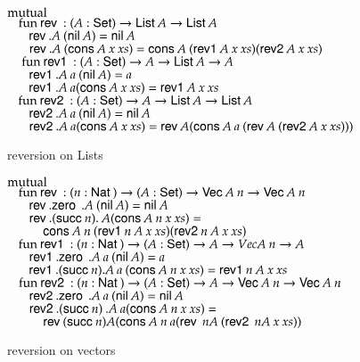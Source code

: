 \begin{figure}[p]
$\mathrm{mutual}\: $  \\
$ \hspace*{3mm} \mathrm{fun}\: \mathsf{rev}\: : ( A : \mathsf{Set} ) \rightarrow{\mathsf{List}\:A \rightarrow\mathsf{List}\:A} $ \\
$ \spc \spc \rev .A \: (\nil A ) = \nil A$\\
$ \spc \spc \rev .A \: (\cons A \:x  \: xs) = \cons A \: (\reva A \: x \: xs) (\revb A \: x \: xs)$\\
$\ \hspace*{3mm} \mathrm{fun}\: \mathsf{rev1}\: : ( A  : \mathsf{Set} ) \rightarrow{A  \rightarrow\mathsf{List}\:A \rightarrow A}$\\
$ \spc \spc \reva .A \: a \: (\nil A ) = a$ \\
$\spc \spc \reva .A \: a (\cons A \: x \: xs) = \reva A \: x \: xs$\\
$\hspace*{3mm} \mathrm{fun}\: \mathsf{rev2}\: : ( A : \mathsf{Set} ) \rightarrow{ A \rightarrow\mathsf{List}\:A \rightarrow\mathsf{List}\:A} $\\
$\spc \spc \revb .A \: a \: (\nil A ) = \nil A $\\
$\spc \spc \revb .A \: a (\cons A\:  x \: xs) = \rev A (\cons A \: a \: (\rev A \: (\revb A \: x \: xs)))$

\caption{reversion on Lists}  
\end{figure}
\begin{figure}[p] 
$\mathrm{mutual}\: $ \\
$\hspace*{3mm} \mathrm{fun}\: \mathsf{rev}\: : ( n : \mathsf{Nat}\:  ) \rightarrow{( A : \mathsf{Set}) \rightarrow{\mathsf{Vec}\:A \: n \rightarrow\mathsf{Vec}\:A \: n}}$\\
$\spc \spc \rev .\zero \: .A  \: (\nil A) = \nil A $\\
$\spc \spc \rev .(\suc n) .\: A (\cons A \: n \: x \: xs) = $\\
$\spcx \cons A \: n \: (\reva n \: A \: x \: xs) (\revb n \: A \: x \: xs) $ \\
$\hspace*{3mm} \mathrm{fun}\: \mathsf{rev1}\: : ( n : \mathsf{Nat}\: ) \rightarrow( A : \mathsf{Set} ) \rightarrow{A \rightarrow Vec A \: n \rightarrow A}$\\
$\spc \spc \reva .\zero  \: .A \: a \: (\nil A) = a $\\
$\spc \spc \reva .(\suc n) .A \: a \: (\cons A \: n \: x \: xs) = \reva n \: A \: x \: xs $\\
$\hspace*{3mm} \mathrm{fun}\: \mathsf{rev2}\: : ( n : \mathsf{Nat}\: ) \rightarrow{( A : \mathsf{Set}) \rightarrow{A \rightarrow\mathsf{Vec}\:A \: n \rightarrow\mathsf{Vec}\:A \: n}}$\\
$ \spc \spc \revb .\zero \: .A  \: a \: (\nil A) = \nil A $\\
$ \spc \spc \revb .(\suc n) \: .A \: a (\cons A \: n \: x \: xs) = $\\
$ \spcx \rev (\suc n) A (\cons A \: n \: a (\rev \: n A \: (\revb \: n A \: x \: xs))$
\caption{reversion on vectors}  
\end{figure}  


